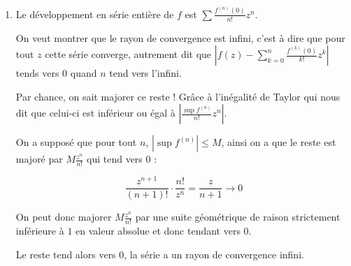 \documentclass[]{article}
\begin{document}
\begin{enumerate}
\item Le développement en série entière de $f$ est $\displaystyle \sum \frac{f^{(n)}(0)}{n!}z^n$.

On veut montrer que le rayon de convergence est infini, c'est à dire que pour tout $z$ cette série converge, autrement dit que $\left|f(z) - \sum_{k=0}^{n} \frac{f^{(k)}(0)}{k!}z^k \right|$ tends vers $0$ quand $n$ tend vers l'infini.

Par chance, on sait majorer ce reste ! Grâce à l'inégalité de Taylor qui nous dit que celui-ci est inférieur ou égal à $\left|\frac{\sup f^{(n)}}{n!}z^n\right|$.

On a supposé que pour tout $n$, $|\sup f^{(n)}| \leqslant M$, ainsi on a que le reste est majoré par $M\frac{z^n}{n!}$ qui tend vers $0$ :

$$\frac{z^{n+1}}{(n+1)!} \cdot \frac{n!}{z^n} = \frac{z}{n+1} \to 0$$

On  peut donc majorer $M \frac{z^n}{n!}$ par une suite géométrique de raison strictement inférieure à $1$ en valeur absolue et donc tendant vers 0.

Le reste tend alors vers 0, la série a un rayon de convergence infini.

\end{enumerate}

\newpage

\tableofcontents
\end{document}
